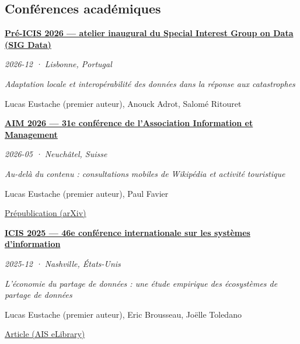 \documentclass[11pt,a4paper]{article}
\newlength{\cvindent}
\newenvironment{cvblock}[1][1]{%
  \par\noindent\hspace*{#1\cvindent}%
  \begin{minipage}{\dimexpr\linewidth-#1\cvindent\relax}%
}{%
  \end{minipage}\par
}
\newenvironment{cvdetails}{%
  \begin{list}{}{%
    \setlength{\leftmargin}{\cvindent}%
    \setlength{\rightmargin}{0pt}%
    \setlength{\topsep}{0.1em}%
    \setlength{\partopsep}{0pt}%
    \setlength{\parsep}{0.05em}%
    \setlength{\itemsep}{0pt}%
  }\item[]\small\ignorespaces
}{%
  \end{list}
}
\begin{document}
\subsection*{Conférences académiques}
\begin{cvblock}[2]
\textbf{\href{https://communities.aisnet.org/data/data-events/inaugural-workshop-in-icis-2026-lisbon}{Pré-ICIS 2026 --- atelier inaugural du Special Interest Group on Data (SIG Data)}}\par
\begin{cvdetails}
{\small\itshape 2026-12 · Lisbonne, Portugal}\par
\textit{Adaptation locale et interopérabilité des données dans la réponse aux catastrophes}\par
{\small Lucas Eustache (premier auteur), Anouck Adrot, Salomé Ritouret}\par
\end{cvdetails}
\end{cvblock}\par\vspace{0.35em}

\begin{cvblock}[2]
\textbf{\href{https://aim2026.sciencesconf.org/}{AIM 2026 --- 31e conférence de l'Association Information et Management}}\par
\begin{cvdetails}
{\small\itshape 2026-05 · Neuchâtel, Suisse}\par
\textit{Au-delà du contenu : consultations mobiles de Wikipédia et activité touristique}\par
{\small Lucas Eustache (premier auteur), Paul Favier}\par
\href{https://arxiv.org/abs/2606.29991}{Prépublication (arXiv)}\par
\end{cvdetails}
\end{cvblock}\par\vspace{0.35em}

\begin{cvblock}[2]
\textbf{\href{https://aisel.aisnet.org/icis2025/sharing_econ/sharing_econ/6/}{ICIS 2025 --- 46e conférence internationale sur les systèmes d'information}}\par
\begin{cvdetails}
{\small\itshape 2025-12 · Nashville, États-Unis}\par
\textit{L'économie du partage de données : une étude empirique des écosystèmes de partage de données}\par
{\small Lucas Eustache (premier auteur), Eric Brousseau, Joëlle Toledano}\par
\href{https://aisel.aisnet.org/icis2025/sharing_econ/sharing_econ/6/}{Article (AIS eLibrary)}\par
\end{cvdetails}
\end{cvblock}\par\vspace{0.35em}
\end{document}
